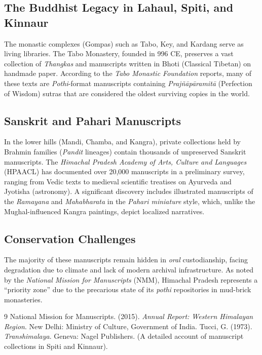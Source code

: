\documentclass[12pt]{article}
\begin{document}
\subsection{The Buddhist Legacy in Lahaul, Spiti, and Kinnaur}
The monastic complexes (Gompas) such as Tabo, Key, and Kardang serve as living libraries. The Tabo Monastery, founded in 996 CE, preserves a vast collection of \textit{Thangkas} and manuscripts written in Bhoti (Classical Tibetan) on handmade paper. According to the \textit{Tabo Monastic Foundation} reports, many of these texts are \textit{Pothi}-format manuscripts containing \textit{Prajñāpāramitā} (Perfection of Wisdom) sutras that are considered the oldest surviving copies in the world.

\subsection{Sanskrit and Pahari Manuscripts}
In the lower hills (Mandi, Chamba, and Kangra), private collections held by Brahmin families (\textit{Pandit} lineages) contain thousands of unpreserved Sanskrit manuscripts. The \textit{Himachal Pradesh Academy of Arts, Culture and Languages} (HPAACL) has documented over 20,000 manuscripts in a preliminary survey, ranging from Vedic texts to medieval scientific treatises on Ayurveda and Jyotisha (astronomy). A significant discovery includes illustrated manuscripts of the \textit{Ramayana} and \textit{Mahabharata} in the \textit{Pahari miniature} style, which, unlike the Mughal-influenced Kangra paintings, depict localized narratives.

\subsection{Conservation Challenges}
The majority of these manuscripts remain hidden in \textit{oral} custodianship, facing degradation due to climate and lack of modern archival infrastructure. As noted by the \textit{National Mission for Manuscripts} (NMM), Himachal Pradesh represents a “priority zone” due to the precarious state of its \textit{pothi} repositories in mud-brick monasteries.

\begin{thebibliography}{9}
 National Mission for Manuscripts. (2015). \textit{Annual Report: Western Himalayan Region}. New Delhi: Ministry of Culture, Government of India.
 Tucci, G. (1973). \textit{Transhimalaya}. Geneva: Nagel Publishers. (A detailed account of manuscript collections in Spiti and Kinnaur).
\end{thebibliography}
\end{document}
